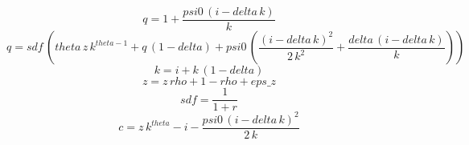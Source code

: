 \begin{dmath}
{q}=1+\frac{{psi0}\, \left({i}-{delta}\, {k}\right)}{{k}}
\end{dmath}
\begin{dmath}
{q}={sdf}\, \left({theta}\, {z}\, {k}^{{theta}-1}+{q}\, \left(1-{delta}\right)+{psi0}\, \left(\frac{\left({i}-{delta}\, {k}\right)^{2}}{2\, {k}^{2}}+\frac{{delta}\, \left({i}-{delta}\, {k}\right)}{{k}}\right)\right)
\end{dmath}
\begin{dmath}
{k}={i}+{k}\, \left(1-{delta}\right)
\end{dmath}
\begin{dmath}
{z}={z}\, {rho}+1-{rho}+{eps\_z}
\end{dmath}
\begin{dmath}
{sdf}=\frac{1}{1+{r}}
\end{dmath}
\begin{dmath}
{c}={z}\, {k}^{{theta}}-{i}-\frac{{psi0}\, \left({i}-{delta}\, {k}\right)^{2}}{2\, {k}}
\end{dmath}
